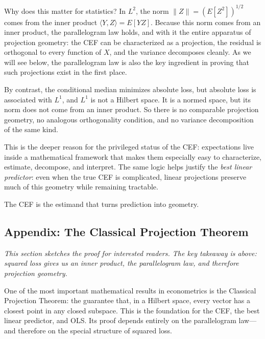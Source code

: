 \documentclass[11pt]{article}
\begin{document}
\medskip

Why does this matter for statistics? In \(L^2\), the norm \(\|Z\| = (E[Z^2])^{1/2}\) comes from the inner product \(\langle Y, Z\rangle = E[YZ]\). Because this norm comes from an inner product, the parallelogram law holds, and with it the entire apparatus of projection geometry: the CEF can be characterized as a projection, the residual is orthogonal to every function of \(X\), and the variance decomposes cleanly. As we will see below, the parallelogram law is also the key ingredient in proving that such projections exist in the first place.

\medskip

By contrast, the conditional median minimizes absolute loss, but absolute loss is associated with \(L^1\), and \(L^1\) is not a Hilbert space. It is a normed space, but its norm does not come from an inner product. So there is no comparable projection geometry, no analogous orthogonality condition, and no variance decomposition of the same kind.

This is the deeper reason for the privileged status of the CEF: expectations live inside a mathematical framework that makes them especially easy to characterize, estimate, decompose, and interpret. The same logic helps justify the \emph{best linear predictor}: even when the true CEF is complicated, linear projections preserve much of this geometry while remaining tractable.

The CEF is the estimand that turns prediction into geometry.

\subsection*{Appendix: The Classical Projection Theorem}

\noindent\textit{This section sketches the proof for interested readers. The key takeaway is above: squared loss gives us an inner product, the parallelogram law, and therefore projection geometry.}

\medskip

One of the most important mathematical results in econometrics is the Classical Projection Theorem: the guarantee that, in a Hilbert space, every vector has a closest point in any closed subspace. This is the foundation for the CEF, the best linear predictor, and OLS. Its proof depends entirely on the parallelogram law---and therefore on the special structure of squared loss.

\medskip
\end{document}
